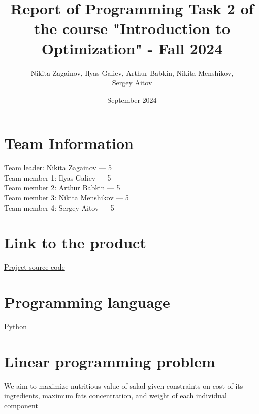 \documentclass{article}
\title{Report of Programming Task 2 of the course "Introduction to Optimization" - Fall 2024}
\author{Nikita Zagainov, Ilyas Galiev, Arthur Babkin, Nikita Menshikov, \\ Sergey Aitov}
\date{September 2024}
\begin{document}
\maketitle

\section{Team Information}
\noindent
Team leader: Nikita Zagainov --- 5 \\
Team member 1: Ilyas Galiev --- 5 \\
Team member 2: Arthur Babkin --- 5 \\
Team member 3: Nikita Menshikov --- 5 \\
Team member 4: Sergey Aitov --- 5

\section{Link to the product}
\href{https://github.com/V1adych/interior-point}{Project source code}

\section{Programming language}
Python

\section{Linear programming problem}
We aim to maximize nutritious value of salad given constraints on cost of its
ingredients, maximum fats concentration, and weight of each individual
component
\end{document}
